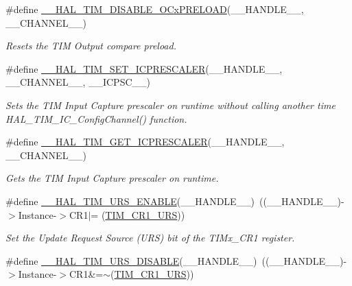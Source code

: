 \begin{DoxyCompactItemize}
\#define \hyperlink{group___t_i_m___exported___macros_ga3e0ec4eb797b54c408a3be067f41a2f8}{\+\_\+\+\_\+\+H\+A\+L\+\_\+\+T\+I\+M\+\_\+\+D\+I\+S\+A\+B\+L\+E\+\_\+\+O\+Cx\+P\+R\+E\+L\+O\+AD}(\+\_\+\+\_\+\+H\+A\+N\+D\+L\+E\+\_\+\+\_\+,  \+\_\+\+\_\+\+C\+H\+A\+N\+N\+E\+L\+\_\+\+\_\+)
\begin{DoxyCompactList}\small\item\em Resets the T\+IM Output compare preload. \end{DoxyCompactList}\item 
\#define \hyperlink{group___t_i_m___exported___macros_gaeb106399b95ef02cec502f58276a0e92}{\+\_\+\+\_\+\+H\+A\+L\+\_\+\+T\+I\+M\+\_\+\+S\+E\+T\+\_\+\+I\+C\+P\+R\+E\+S\+C\+A\+L\+ER}(\+\_\+\+\_\+\+H\+A\+N\+D\+L\+E\+\_\+\+\_\+,  \+\_\+\+\_\+\+C\+H\+A\+N\+N\+E\+L\+\_\+\+\_\+,  \+\_\+\+\_\+\+I\+C\+P\+S\+C\+\_\+\+\_\+)
\begin{DoxyCompactList}\small\item\em Sets the T\+IM Input Capture prescaler on runtime without calling another time H\+A\+L\+\_\+\+T\+I\+M\+\_\+\+I\+C\+\_\+\+Config\+Channel() function. \end{DoxyCompactList}\item 
\#define \hyperlink{group___t_i_m___exported___macros_gabfeec6b3c67a5747c7dbd20aff61d8e2}{\+\_\+\+\_\+\+H\+A\+L\+\_\+\+T\+I\+M\+\_\+\+G\+E\+T\+\_\+\+I\+C\+P\+R\+E\+S\+C\+A\+L\+ER}(\+\_\+\+\_\+\+H\+A\+N\+D\+L\+E\+\_\+\+\_\+,  \+\_\+\+\_\+\+C\+H\+A\+N\+N\+E\+L\+\_\+\+\_\+)
\begin{DoxyCompactList}\small\item\em Gets the T\+IM Input Capture prescaler on runtime. \end{DoxyCompactList}\item 
\#define \hyperlink{group___t_i_m___exported___macros_ga3b06856bd6d7e10cfff342b1726db51d}{\+\_\+\+\_\+\+H\+A\+L\+\_\+\+T\+I\+M\+\_\+\+U\+R\+S\+\_\+\+E\+N\+A\+B\+LE}(\+\_\+\+\_\+\+H\+A\+N\+D\+L\+E\+\_\+\+\_\+)~((\+\_\+\+\_\+\+H\+A\+N\+D\+L\+E\+\_\+\+\_\+)-\/$>$Instance-\/$>$C\+R1$\vert$= (\hyperlink{group___peripheral___registers___bits___definition_ga06c997c2c23e8bef7ca07579762c113b}{T\+I\+M\+\_\+\+C\+R1\+\_\+\+U\+RS}))
\begin{DoxyCompactList}\small\item\em Set the Update Request Source (U\+RS) bit of the T\+I\+Mx\+\_\+\+C\+R1 register. \end{DoxyCompactList}\item 
\#define \hyperlink{group___t_i_m___exported___macros_gafacb551a4c537e62a0fe740b2f12236c}{\+\_\+\+\_\+\+H\+A\+L\+\_\+\+T\+I\+M\+\_\+\+U\+R\+S\+\_\+\+D\+I\+S\+A\+B\+LE}(\+\_\+\+\_\+\+H\+A\+N\+D\+L\+E\+\_\+\+\_\+)~((\+\_\+\+\_\+\+H\+A\+N\+D\+L\+E\+\_\+\+\_\+)-\/$>$Instance-\/$>$C\+R1\&=$\sim$(\hyperlink{group___peripheral___registers___bits___definition_ga06c997c2c23e8bef7ca07579762c113b}{T\+I\+M\+\_\+\+C\+R1\+\_\+\+U\+RS}))

\end{DoxyCompactItemize}

